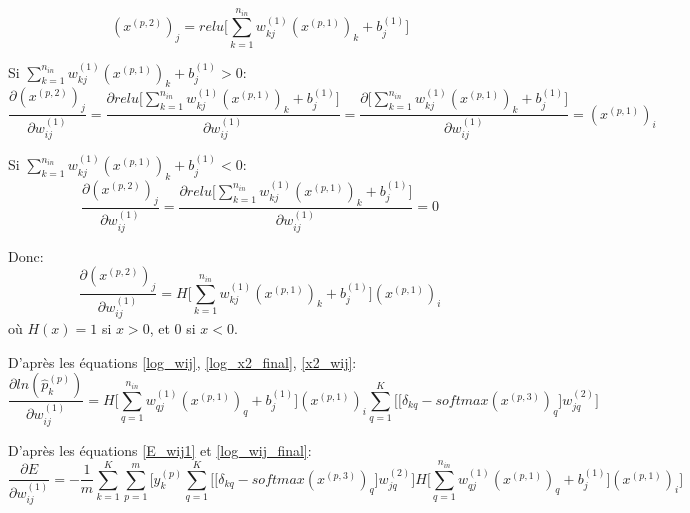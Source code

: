 \documentclass[a4paper,11pt,oneside,roman]{article}
\begin{document}
    \begin{equation}
        \nonumber
        (x^{(p,2)})_{j} = relu\bigg[\sum\limits_{k=1}^{n_{in}} w_{kj}^{(1)}(x^{(p,1)})_{k} + b_j^{(1)}\bigg]
    \end{equation}
    
    Si $\sum\limits_{k=1}^{n_{in}} w_{kj}^{(1)}(x^{(p,1)})_{k} + b_j^{(1)} > 0$:
    \begin{equation}
        \nonumber
        \frac{\partial (x^{(p,2)})_j}{\partial w_{ij}^{(1)}} = \frac{\partial relu\bigg[\sum\limits_{k=1}^{n_{in}} w_{kj}^{(1)}(x^{(p,1)})_{k} + b_j^{(1)}\bigg]}{\partial w_{ij}^{(1)}} = \frac{\partial \bigg[\sum\limits_{k=1}^{n_{in}} w_{kj}^{(1)}(x^{(p,1)})_{k} + b_j^{(1)}\bigg]}{\partial w_{ij}^{(1)}} = (x^{(p,1)})_i
    \end{equation}
    
    Si $\sum\limits_{k=1}^{n_{in}} w_{kj}^{(1)}(x^{(p,1)})_{k} + b_j^{(1)} < 0$:
    \begin{equation}
        \nonumber
        \frac{\partial (x^{(p,2)})_j}{\partial w_{ij}^{(1)}} = \frac{\partial relu\bigg[\sum\limits_{k=1}^{n_{in}} w_{kj}^{(1)}(x^{(p,1)})_{k} + b_j^{(1)}\bigg]}{\partial w_{ij}^{(1)}} = 0
    \end{equation}
    
    Donc:
    \begin{equation}
        \frac{\partial (x^{(p,2)})_j}{\partial w_{ij}^{(1)}} = H\bigg[\sum\limits_{k=1}^{n_{in}} w_{kj}^{(1)}(x^{(p,1)})_{k} + b_j^{(1)}\bigg](x^{(p,1)})_i
        \label{x2_wij}
    \end{equation}
    où $H(x) = 1$ si $x>0$, et $0$ si $x<0$.

    D'après les équations \eqref{log_wij}, \eqref{log_x2_final}, \eqref{x2_wij}:
    \begin{equation}
        \frac{\partial ln(\hat{p}_{k}^{(p)})}{\partial w_{ij}^{(1)}} = H\bigg[\sum\limits_{q=1}^{n_{in}} w_{qj}^{(1)}(x^{(p,1)})_{q} + b_j^{(1)}\bigg](x^{(p,1)})_i \sum\limits_{q=1}^{K} \bigg[\big[ \delta_{kq} - softmax(x^{(p,3)})_q \big] w_{jq}^{(2)} \bigg] 
        \label{log_wij_final}
    \end{equation}

    D'après les équations \eqref{E_wij1} et \eqref{log_wij_final}:
    \begin{equation}
        \nonumber
        \frac{\partial E}{\partial w_{ij}^{(1)}} = -\frac{1}{m}  \sum\limits_{k=1}^{K} \sum\limits_{p=1}^{m} \Bigg[ y_k^{(p)} \sum\limits_{q=1}^{K} \bigg[ \big[ \delta_{kq} - softmax(x^{(p,3)})_q \big] w_{jq}^{(2)} \bigg] H\big[\sum\limits_{q=1}^{n_{in}} w_{qj}^{(1)}(x^{(p,1)})_{q} + b_j^{(1)}\big](x^{(p,1)})_i \Bigg]
    \end{equation}
\end{document}
